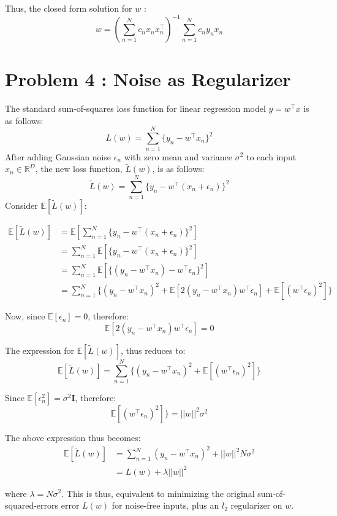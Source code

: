 \documentclass{article}
\begin{document}
Thus, the closed form solution for $w$ :
$$w = (\sum_{n=1}^Nc_nx_nx_n^\top)^{-1}\sum_{n=1}^N c_ny_nx_n$$

\section{Problem 4 : Noise as Regularizer}
The standard sum-of-squares loss function for linear regression model $y=w^\top x$ is as follows:
$$L(w) = \sum_{n=1}^N \{y_n - w^\top x_n\}^2$$
After adding Gaussian noise $\epsilon_n$ with zero mean and variance $\sigma^2$ to each input $x_n \in \mathds{R}^D$, the new loss function, $\tilde{L}(w)$, is as follows:
$$\tilde{L}(w) = \sum_{n=1}^N\{y_n-w^\top(x_n+\epsilon_n)\}^2$$
Consider $\mathds{E}[\tilde{L}(w)]$:

\begin{equation*}
\begin{aligned}
\mathds{E}[\tilde{L}(w)] &= \mathds{E}[\sum_{n=1}^N\{y_n-w^\top(x_n+\epsilon_n)\}^2] \\
&= \sum_{n=1}^N\mathds{E}[\{y_n-w^\top(x_n+\epsilon_n)\}^2] \\
&= \sum_{n=1}^N\mathds{E}[\{(y_n- w^\top x_n )-w^\top \epsilon_n\}^2] \\
&= \sum_{n=1}^N \{ (y_n- w^\top x_n )^2 +  \mathds{E}[2(y_n- w^\top x_n )w^\top \epsilon_n]+ \mathds{E}[(w^\top \epsilon_n)^2]\}
\end{aligned}
\end{equation*}

Now, since $\mathds{E}[\epsilon_n] = 0$, therefore:
$$\mathds{E}[2(y_n- w^\top x_n )w^\top \epsilon_n] = 0$$

The expression for $\mathds{E}[\tilde{L}(w)]$, thus reduces to:
$$\mathds{E}[\tilde{L}(w)] = \sum_{n=1}^N \{ (y_n- w^\top x_n )^2 +  \mathds{E}[(w^\top \epsilon_n)^2]\}$$

Since $\mathds{E}[\epsilon_n^2] = \sigma^2$\textbf{I}, therefore:
$$\mathds{E}[(w^\top \epsilon_n)^2]\} = ||w||^2\sigma^2$$

The above expression thus becomes:
\begin{equation*}
\begin{aligned}
\mathds{E}[\tilde{L}(w)] &= \sum_{n=1}^N (y_n- w^\top x_n )^2 + ||w||^2N\sigma^2\\
&= L(w) + \lambda||w||^2
\end{aligned}
\end{equation*}

where $\lambda = N\sigma^2$. This is thus, equivalent to minimizing the original sum-of-squared-errors error $L(w)$ for noise-free
inputs, plus an $l_2$ regularizer on $w$.
\end{document}
